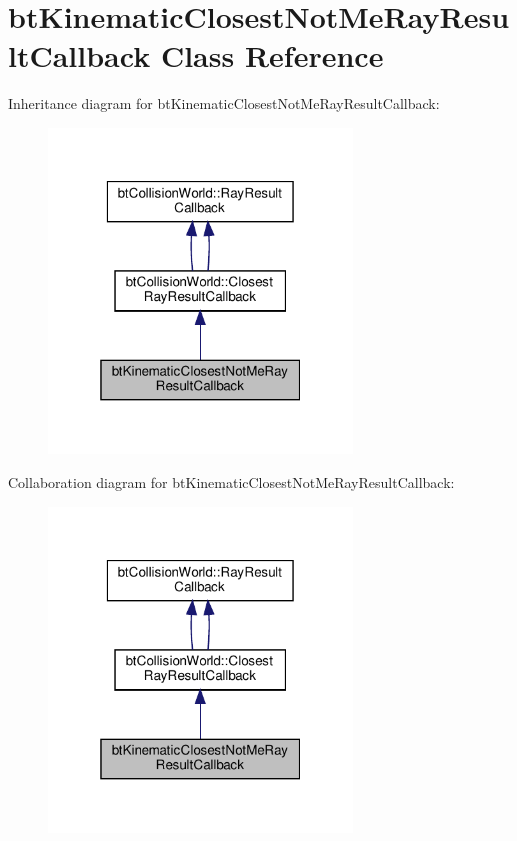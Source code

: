\hypertarget{classbtKinematicClosestNotMeRayResultCallback}{}\section{bt\+Kinematic\+Closest\+Not\+Me\+Ray\+Result\+Callback Class Reference}
\label{classbtKinematicClosestNotMeRayResultCallback}


Inheritance diagram for bt\+Kinematic\+Closest\+Not\+Me\+Ray\+Result\+Callback\+:
\nopagebreak
\begin{figure}[H]
\begin{center}
\leavevmode
\includegraphics[width=229pt]{classbtKinematicClosestNotMeRayResultCallback__inherit__graph}
\end{center}
\end{figure}


Collaboration diagram for bt\+Kinematic\+Closest\+Not\+Me\+Ray\+Result\+Callback\+:
\nopagebreak
\begin{figure}[H]
\begin{center}
\leavevmode
\includegraphics[width=229pt]{classbtKinematicClosestNotMeRayResultCallback__coll__graph}
\end{center}
\end{figure}
